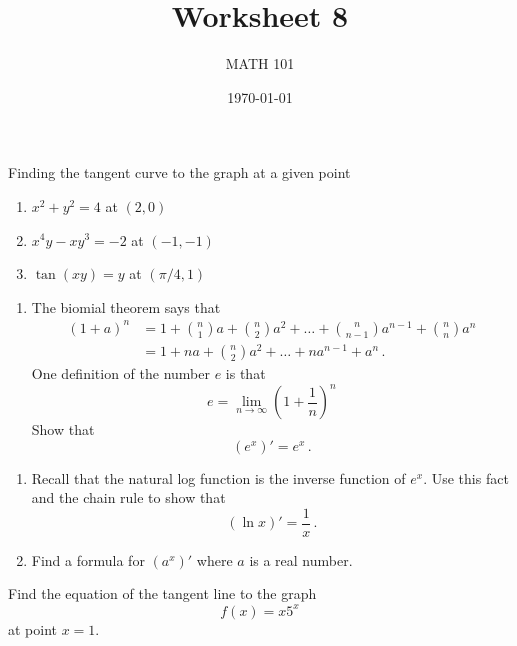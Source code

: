 \documentclass[12pt]{amsart}
\title{ Worksheet 8}
\author{MATH 101}
\date{\today}
\begin{document}
\maketitle


\begin{question}
	Finding the tangent curve to the graph at a given point
	\begin{enumerate}
		\item $ x^2 + y^2 = 4$ at $(2,0)$
		      \vspace{5cm}
		\item $x^4y - xy^3 = -2$ at $(-1,-1)$
		      \vspace{5cm}
		\item $ \tan (xy) = y$ at $(\pi/4, 1)$
		      \vspace{5cm}
	\end{enumerate}
\end{question}

\begin{question}
	\begin{enumerate}
		\item The biomial theorem says that
		      \begin{equation*}
			      \begin{aligned}
				      (1 + a)^n
				       & = 1 + {n \choose 1} a + {n \choose 2} a^2 + \dots + {n \choose n-1} a^{n-1} + {n \choose n} a^n \\
				       & = 1 + n a + {n \choose 2} a^2 + \dots + n a^{n-1} +  a^n \,.
			      \end{aligned}
		      \end{equation*}
		      One definition of the number $e$ is that
		      \begin{equation*}
			      e = \lim_{n\to \infty} \left(1 + \frac{1}{n}\right)^n
		      \end{equation*}
		      Show that
		      \begin{equation*}
			      (e^x)' = e^x \,.
		      \end{equation*}
	\end{enumerate}

\end{question}

\newpage

\begin{question}
	\begin{enumerate}
		\item
		      Recall that the natural log function is the inverse function of $e^x$.
		      Use this fact and the chain rule to show that
		      \begin{equation*}
			      (\ln x)' = \frac{1}{x} \,.
		      \end{equation*}
		      \vspace{5cm}
		\item Find a formula for $(a^x)'$ where $a$ is a real number.
		      \vspace{5cm}
	\end{enumerate}
\end{question}


\begin{question}
	Find the equation of the tangent line to the graph
	$$ f(x) = x 5^x $$ at point $x = 1$.
\end{question}
\end{document}
